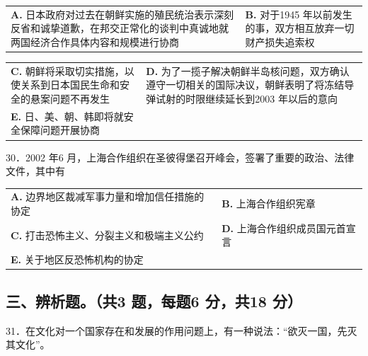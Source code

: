 \documentclass[UTF8,11pt]{ctexart}
\begin{document}
\begin{center}\begin{tabular}{>{\raggedright\arraybackslash}p{\dimexpr(\linewidth-4\tabcolsep)/2\relax}>{\raggedright\arraybackslash}p{\dimexpr(\linewidth-4\tabcolsep)/2\relax}}
\textbf{A.} 日本政府对过去在朝鲜实施的殖民统治表示深刻反省和诚挚道歉，在邦交正常化的谈判中真诚地就两国经济合作具体内容和规模进行协商 & \textbf{B.} 对于1945 年以前发生的事，双方相互放弃一切财产损失追索权\\[.35em]\end{tabular}\end{center}

\begin{center}\begin{tabular}{>{\raggedright\arraybackslash}p{\dimexpr(\linewidth-4\tabcolsep)/2\relax}>{\raggedright\arraybackslash}p{\dimexpr(\linewidth-4\tabcolsep)/2\relax}}
\textbf{C.} 朝鲜将采取切实措施，以使关系到日本国民生命和安全的悬案问题不再发生 & \textbf{D.} 为了一揽子解决朝鲜半岛核问题，双方确认遵守一切相关的国际决议，朝鲜表明了将冻结导弹试射的时限继续延长到2003 年以后的意向\\[.35em]
\textbf{E.} 日、美、朝、韩即将就安全保障问题开展协商 & \\[.35em]\end{tabular}\end{center}

30．2002 年6 月，上海合作组织在圣彼得堡召开峰会，签署了重要的政治、法律文件，其中有


\begin{center}\begin{tabular}{>{\raggedright\arraybackslash}p{\dimexpr(\linewidth-4\tabcolsep)/2\relax}>{\raggedright\arraybackslash}p{\dimexpr(\linewidth-4\tabcolsep)/2\relax}}
\textbf{A.} 边界地区裁减军事力量和增加信任措施的协定 & \textbf{B.} 上海合作组织宪章\\[.35em]
\textbf{C.} 打击恐怖主义、分裂主义和极端主义公约 & \textbf{D.} 上海合作组织成员国元首宣言\\[.35em]
\textbf{E.} 关于地区反恐怖机构的协定 & \\[.35em]\end{tabular}\end{center}

\subsection*{三、辨析题。（共3 题，每题6 分，共18 分）}

31．在文化对一个国家存在和发展的作用问题上，有一种说法：“欲灭一国，先灭其文化”。
\end{document}
